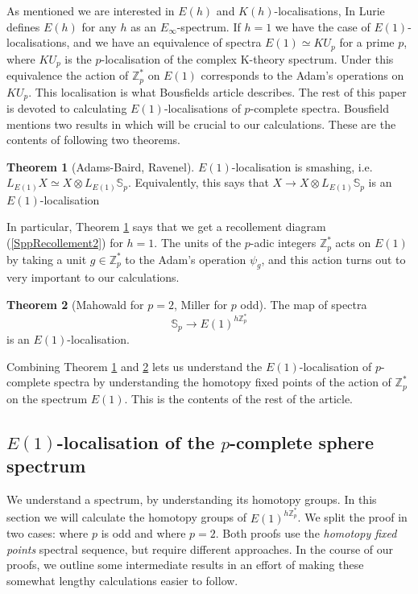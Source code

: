 \documentclass[a4paper]{article} %
\theoremstyle{definition}
\newtheorem{theorem}{Theorem} %
\newcommand{\Z}{\mathbb{Z}}
\newcommand{\Sph}{\mathbb{S}}
\begin{document}
As mentioned we are interested in $E(h)$ and $K(h)$-localisations, In \cite[Theorem~5.0.2]{ellipticcohomII} Lurie defines $E(h)$ for any $h$ as an $E_\infty$-spectrum. If $h=1$ we have the case of $E(1)$-localisations, and we have an equivalence of spectra $E(1) \simeq KU_p$ for a prime $p$, where $KU_p$ is the $p$-localisation of the complex K-theory spectrum. Under this equivalence the action of $\Z_p^*$ on $E(1)$ corresponds to the Adam's operations on $KU_p$. This localisation is what Bousfields article \cite{bousfield1979localization} describes. The rest of this paper is devoted to calculating $E(1)$-localisations of $p$-complete spectra. Bousfield mentions two results in \cite{bousfield1979localization} which will be crucial to our calculations. These are the contents of following two theorems.
\begin{theorem}[Adams-Baird, Ravenel]\label{Adams-Baird, Ravenel}
  $E(1)$-localisation is smashing, i.e. $L_{E(1)}X \simeq X \otimes L_{E(1)} \mathbb{S}_p$. Equivalently, this says that $X \to X \otimes L_{E(1)} \mathbb{S}_p$ is an $E(1)$-localisation
\end{theorem}
In particular, Theorem \ref{Adams-Baird, Ravenel} says that we get a recollement diagram (\ref{SppRecollement2}) for $h=1$. The units of the $p$-adic integers $\Z_p^*$ acts on $E(1)$ by taking a unit $g \in \Z_p^*$ to the Adam's operation $\psi_g$, and this action turns out to very important to our calculations.
\begin{theorem}[Mahowald for $p=2$, Miller for $p$ odd]\label{Mahowald, Miller}
   The map of spectra
     $$\Sph_p \to E(1)^{h\Z_p^*}$$
     is an $E(1)$-localisation.
\end{theorem}
Combining Theorem \ref{Adams-Baird, Ravenel} and \ref{Mahowald, Miller} lets us understand the $E(1)$-localisation of $p$-complete spectra by understanding the homotopy fixed points of the action of $\Z_p^*$ on the spectrum $E(1)$. This is the contents of the rest of the article.

\subsection{$E(1)$-localisation of the $p$-complete sphere spectrum}

We understand a spectrum, by understanding its homotopy groups. In this section we will calculate the homotopy groups of $E(1)^{h\Z_p^*}$. We split the proof in two cases: where $p$ is odd and where $p=2$. Both proofs use the \textit{homotopy fixed points} spectral sequence, but require different approaches. In the course of our proofs, we outline some intermediate results in an effort of making these somewhat lengthy calculations easier to follow.
\end{document}
